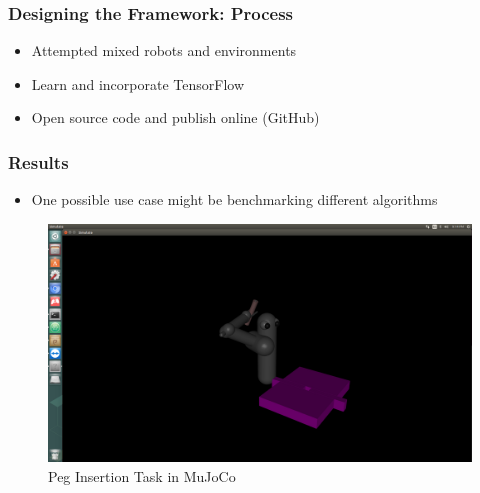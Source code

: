\documentclass[handout]{beamer}
\begin{document}
\begin{frame}
    \frametitle{Designing the Framework: Process}
    \begin{itemize}
        \item{Attempted mixed robots and environments}
        \item{Learn and incorporate TensorFlow}
        \item{Open source code and publish online (GitHub)}
    \end{itemize}
\end{frame}
\begin{frame}
    \frametitle{Results}
    \begin{itemize}
        \item{One possible use case might be benchmarking different algorithms}
    \end{itemize}
    \begin{figure}
        \includegraphics[scale=0.1]{sim1}
        \caption{Peg Insertion Task in MuJoCo}
    \end{figure}
\end{frame}
\end{document}
